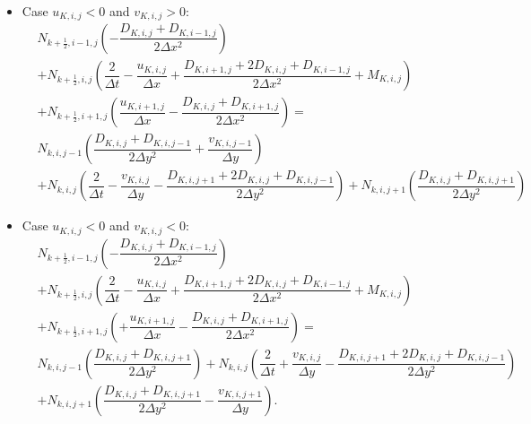 \begin{itemize}
\begin{align}
\end{align}
%
\item Case $u_{K,i,j}<0$ and $v_{K,i,j}>0$:
\begin{align}
  \label{eq:2steps-ADI-x-uneg-vpos}
  \nonumber
    &N_{k+\frac{1}{2},i-1,j}  \left(
      -\dfrac{D_{K,i,j}+D_{K,i-1,j}}{2\Delta x^2}
    \right) \\\nonumber
    &+ N_{k+\frac{1}{2},i,j}  \left(
      \dfrac{2}{\Delta t} 
    -\dfrac{u_{K,i,j}}{\Delta x}
    +\dfrac{D_{K,i+1,j}+2D_{K,i,j}+D_{K,i-1,j}}{2\Delta x^2}
    + M_{K,i,j}    
    \right) \\\nonumber
    &+ N_{k+\frac{1}{2},i+1,j} \left(
      \dfrac{u_{K,i+1,j}}{\Delta x}
      -\dfrac{D_{K,i,j}+D_{K,i+1,j}}{2\Delta x^2}
    \right) 
    = \\
    &N_{k,i,j-1}\left(\dfrac{D_{K,i,j}+D_{K,i,j-1}}{2\Delta y^2}+\dfrac{v_{K,i,j-1}}{\Delta y}\right)\\
    \nonumber
    &+ N_{k,i,j}\left(\dfrac{2}{\Delta t}-\dfrac{v_{K,i,j}}{\Delta y}-\dfrac{D_{K,i,j+1}+2D_{K,i,j}+D_{K,i,j-1}}{2\Delta y^2} \right)
    +N_{k,i,j+1}\left(\dfrac{D_{K,i,j}+D_{K,i,j+1}}{2\Delta y^2}\right)
\end{align}
\item Case $u_{K,i,j}<0$ and $v_{K,i,j}<0$:
\begin{align}
  \label{eq:2steps-ADI-x-uneg-vneg}
  \nonumber
    &N_{k+\frac{1}{2},i-1,j}  \left(
      -\dfrac{D_{K,i,j}+D_{K,i-1,j}}{2\Delta x^2}
    \right) \\\nonumber
    &+ N_{k+\frac{1}{2},i,j}  \left(
      \dfrac{2}{\Delta t} 
    -\dfrac{u_{K,i,j}}{\Delta x}
    +\dfrac{D_{K,i+1,j}+2D_{K,i,j}+D_{K,i-1,j}}{2\Delta x^2}
    + M_{K,i,j}    
    \right) \\\nonumber
    &+ N_{k+\frac{1}{2},i+1,j} \left(
      +\dfrac{u_{K,i+1,j}}{\Delta x}
      -\dfrac{D_{K,i,j}+D_{K,i+1,j}}{2\Delta x^2}
    \right) 
    = \\
    \nonumber
    &N_{k,i,j-1}\left(\dfrac{D_{K,i,j}+D_{K,i,j+1}}{2\Delta y^2}\right)
    + N_{k,i,j}\left(\dfrac{2}{\Delta t}+\dfrac{v_{K,i,j}}{\Delta y}-\dfrac{D_{K,i,j+1}+2D_{K,i,j}+D_{K,i,j-1}}{2\Delta y^2} \right)\\
    &+N_{k,i,j+1}\left(\dfrac{D_{K,i,j}+D_{K,i,j+1}}{2\Delta y^2}-\dfrac{v_{K,i,j+1}}{\Delta y}\right).
\end{align}
\end{itemize}

